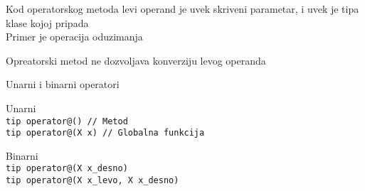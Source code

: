 \documentclass{article}
\newenvironment{xitemize}{%
    
    \itemize
    \larger
}{%
    \enditemize
}
\let\olditemize\itemize
\let\endolditemize\enditemize
\renewenvironment{itemize}{%
    \smaller
    \olditemize
}{%
    \endolditemize
}
\providecommand{\inlinecode}[1]{\texttt{#1}}
\begin{document}
\begin{xitemize}
\begin{itemize}
    \item Kod operatorskog metoda levi operand je uvek skriveni parametar, i uvek je tipa klase kojoj pripada \\
    Primer je operacija oduzimanja
    \item Opreatorski metod ne dozvoljava konverziju levog operanda
\end{itemize}
\item Unarni i binarni operatori
\begin{multicols}{2}
\begin{itemize}
    \item Unarni\\
    \inlinecode{tip operator@() // Metod}\\
    \inlinecode{tip operator@(X x) // Globalna funkcija}
    \columnbreak
    \item Binarni\\
    \inlinecode{tip operator@(X x\_desno) }\\
    \inlinecode{tip operator@(X x\_levo, X x\_desno)}
\end{itemize}
\end{multicols}


\end{xitemize}
\end{document}
